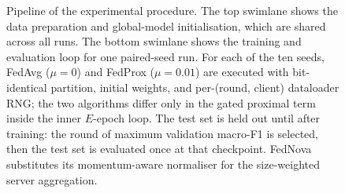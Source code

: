 \documentclass[11pt,a4paper]{article}
\begin{document}
\begin{figure}[!htbp]
\caption{Pipeline of the experimental procedure. The top swimlane shows
the data preparation and global-model initialisation, which are shared
across all runs. The bottom swimlane shows the training and evaluation
loop for one paired-seed run. For each of the ten seeds, FedAvg
($\mu = 0$) and FedProx ($\mu = 0.01$) are executed with bit-identical
partition, initial weights, and per-(round, client) dataloader RNG;
the two algorithms differ only in the gated proximal term inside the
inner $E$-epoch loop. The test set is held out until after training:
the round of maximum validation macro-F1 is selected, then the test
set is evaluated once at that checkpoint. FedNova substitutes its
momentum-aware normaliser for the size-weighted server aggregation.}
\label{fig:pipeline}
\end{figure}
\end{document}
